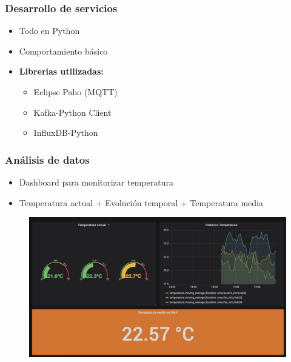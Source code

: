 \documentclass[12pt]{beamer}
\begin{document}
        \begin{frame}
            \frametitle{Desarrollo de servicios}

            \begin{itemize}
                \item Todo en Python
                \item Comportamiento básico
                \item \textbf{Librerias utilizadas:}
                \begin{itemize}
                    \item Eclipse Paho (MQTT)
                    \item Kafka-Python Client
                    \item InfluxDB-Python
                \end{itemize}
            \end{itemize}
        \end{frame}

        \begin{frame}
            \frametitle{Análisis de datos}

            \begin{itemize}
                \item Dashboard para monitorizar temperatura
                \item Temperatura actual + Evolución temporal + Temperatura media
            \end{itemize}

            \begin{figure}[]
                \centering
                \includegraphics[height=0.5\paperheight]{dashboard}
            \end{figure}
        \end{frame}
\end{document}

